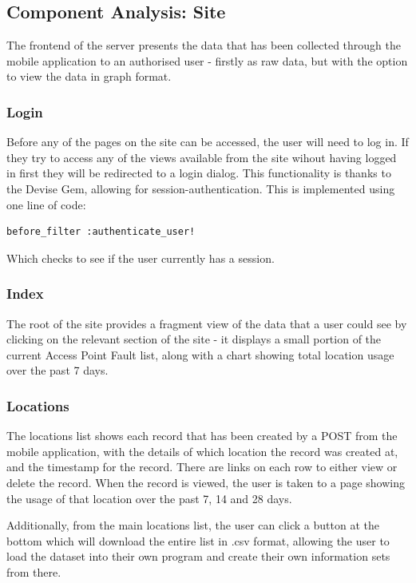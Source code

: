 \documentclass[11pt]{informatics-report}
\begin{document}
\subsection{Component Analysis: Site}

The frontend of the server presents the data that has been collected through the mobile application to an authorised user - firstly as raw data, but with the option to view the data in graph format. 

\subsubsection{Login}

Before any of the pages on the site can be accessed, the user will need to log in. If they try to access any of the views available from the site wihout having logged in first they will be redirected to a login dialog. This functionality is thanks to the Devise Gem, allowing for session-authentication. This is implemented using one line of code:

\begin{verbatim}
before_filter :authenticate_user!
\end{verbatim}

Which checks to see if the user currently has a session.

\subsubsection{Index}

The root of the site provides a fragment view of the data that a user could see by clicking on the relevant section of the site - it displays a small portion of the current Access Point Fault list, along with a chart showing total location usage over the past 7 days.

\subsubsection{Locations}

The locations list shows each record that has been created by a POST from the mobile application, with the details of which location the record was created at, and the timestamp for the record. There are links on each row to either view or delete the record. When the record is viewed, the user is taken to a page showing the usage of that location over the past 7, 14 and 28 days. 

Additionally, from the main locations list, the user can click a button at the bottom which will download the entire list in .csv format, allowing the user to load the dataset into their own program and create their own information sets from there.
\end{document}
